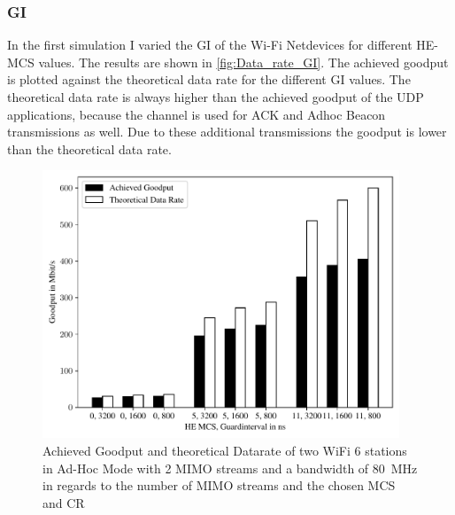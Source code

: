 \subsubsection*{\acl{GI}}

In the first simulation I varied the \ac{GI} of the Wi-Fi Netdevices for different HE-\ac{MCS} values.
The results are shown in \autoref{fig:Data_rate_GI}. The achieved goodput is plotted against the theoretical data rate for the different \ac{GI} values.
The theoretical data rate is always higher than the achieved goodput of the UDP applications, because the channel is used for ACK and Adhoc Beacon transmissions as well. Due to
these additional transmissions the goodput is lower than the theoretical data rate.
\begin{figure}[H]
	\centering
	\includegraphics[width=0.95\textwidth]{figures/gi_dataRate_simulation.pdf}
	\caption{Achieved Goodput and theoretical Datarate of two WiFi 6 stations in Ad-Hoc Mode with \num{2} \ac{MIMO} streams and a bandwidth of \SI{80}{\mega\hertz} in regards to the number of \ac{MIMO} streams and the chosen \ac{MCS} and \ac{CR}}%
	\label{fig:Data_rate_GI}%
\end{figure}

